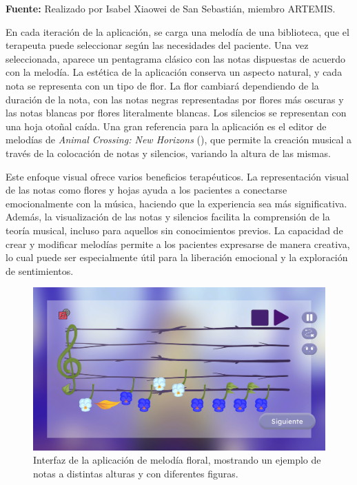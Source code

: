 \begin{center}
	\textbf{Fuente:} Realizado por Isabel Xiaowei de San Sebastián, miembro ARTEMIS.
\end{center}

En cada iteración de la aplicación, se carga una melodía de una biblioteca, que el terapeuta puede seleccionar según las necesidades del paciente. Una vez seleccionada, aparece un pentagrama clásico con las notas dispuestas de acuerdo con la melodía. La estética de la aplicación conserva un aspecto natural, y cada nota se representa con un tipo de flor. La flor cambiará dependiendo de la duración de la nota, con las notas negras representadas por flores más oscuras y las notas blancas por flores literalmente blancas. Los silencios se representan con una hoja otoñal caída. Una gran referencia para la aplicación es el editor de melodías de \textit{Animal Crossing: New Horizons} (\cite{ACNH:2020}), que permite la creación musical a través de la colocación de notas y silencios, variando la altura de las mismas. 

Este enfoque visual ofrece varios beneficios terapéuticos. La representación visual de las notas como flores y hojas ayuda a los pacientes a conectarse emocionalmente con la música, haciendo que la experiencia sea más significativa. Además, la visualización de las notas y silencios facilita la comprensión de la teoría musical, incluso para aquellos sin conocimientos previos. La capacidad de crear y modificar melodías permite a los pacientes expresarse de manera creativa, lo cual puede ser especialmente útil para la liberación emocional y la exploración de sentimientos.

\begin{figure}[h!]
	\centering
	\includegraphics[width=0.8\linewidth]{Figuras/Desarrollo/MelodiaFloralGame.png}
	\caption[Interfaz de la aplicación melodía floral.]{Interfaz de la aplicación de melodía floral, mostrando un ejemplo de notas a distintas alturas y con diferentes figuras.}
	\label{fig:FloralMelodyGame}
	\vspace{-18pt}
\end{figure}

